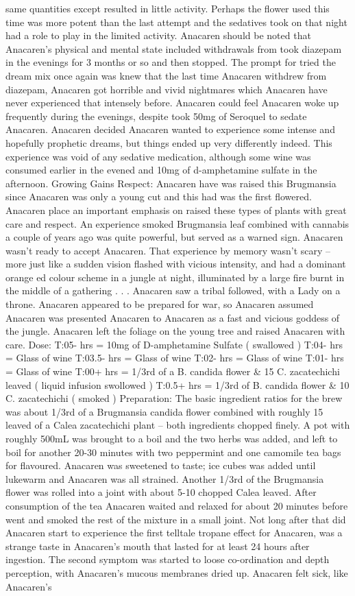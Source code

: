 \documentclass[12pt]{book}
\begin{document}
same quantities except resulted in little activity. Perhaps the flower used this time was more potent than the last attempt and the sedatives took on that night had a role to play in the limited activity. Anacaren should be noted that Anacaren's physical and mental state included withdrawals from took diazepam in the evenings for 3 months or so and then stopped. The prompt for tried the dream mix once again was knew that the last time Anacaren withdrew from diazepam, Anacaren got horrible and vivid nightmares which Anacaren have never experienced that intensely before. Anacaren could feel Anacaren woke up frequently during the evenings, despite took 50mg of Seroquel to sedate Anacaren. Anacaren decided Anacaren wanted to experience some intense and hopefully prophetic dreams, but things ended up very differently indeed. This experience was void of any sedative medication, although some wine was consumed earlier in the evened and 10mg of d-amphetamine sulfate in the afternoon. Growing Gains Respect: Anacaren have was raised this Brugmansia since Anacaren was only a young cut and this had was the first flowered. Anacaren place an important emphasis on raised these types of plants with great care and respect. An experience smoked Brugmansia leaf combined with cannabis a couple of years ago was quite powerful, but served as a warned sign. Anacaren wasn't ready to accept Anacaren. That experience by memory wasn't scary -- more just like a sudden vision flashed with vicious intensity, and had a dominant orange ed colour scheme in a jungle at night, illuminated by a large fire burnt in the middle of a gathering . . .  Anacaren saw a tribal followed, with a Lady on a throne. Anacaren appeared to be prepared for war, so Anacaren assumed Anacaren was presented Anacaren to Anacaren as a fast and vicious goddess of the jungle. Anacaren left the foliage on the young tree and raised Anacaren with care. Dose: T:05- hrs = 10mg of D-amphetamine Sulfate ( swallowed ) T:04- hrs = Glass of wine T:03.5- hrs = Glass of wine T:02- hrs = Glass of wine T:01- hrs = Glass of wine T:00+ hrs = 1/3rd of a B. candida flower \& 15 C. zacatechichi leaved ( liquid infusion swollowed ) T:0.5+ hrs = 1/3rd of B. candida flower \& 10 C. zacatechichi ( smoked ) Preparation: The basic ingredient ratios for the brew was about 1/3rd of a Brugmansia candida flower combined with roughly 15 leaved of a Calea zacatechichi plant -- both ingredients chopped finely. A pot with roughly 500mL was brought to a boil and the two herbs was added, and left to boil for another 20-30 minutes with two peppermint and one camomile tea bags for flavoured. Anacaren was sweetened to taste; ice cubes was added until lukewarm and Anacaren was all strained. Another 1/3rd of the Brugmansia flower was rolled into a joint with about 5-10 chopped Calea leaved. After consumption of the tea Anacaren waited and relaxed for about 20 minutes before went and smoked the rest of the mixture in a small joint. Not long after that did Anacaren start to experience the first telltale tropane effect for Anacaren, was a strange taste in Anacaren's mouth that lasted for at least 24 hours after ingestion. The second symptom was started to loose co-ordination and depth perception, with Anacaren's mucous membranes dried up. Anacaren felt sick, like Anacaren's 
\end{document}
